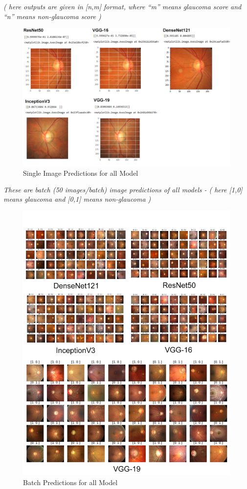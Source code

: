\documentclass[conference]{IEEEtran}
\begin{document}
\noindent\textit{( here outputs are given in [n,m] format, where “m” means glaucoma score and “n” means non-glaucoma score )}

\begin{figure}[hbt!]
\centering
\includegraphics[scale=0.25]{fig-53.png}
\caption{Single Image Predictions for all Model}
\label{fig:x Single Image Predictions for all Model}
\end{figure}



\noindent\textit{These are batch (50 images/batch) image predictions of all models - ( here [1,0] means glaucoma and [0,1] means non-glaucoma )}

\begin{figure}[hbt!]
\centering
\includegraphics[scale=0.30]{batch prediction.png}
\caption{Batch Predictions for all Model}
\label{fig:x Batch Predictions for all Model}
\end{figure}
\end{document}
